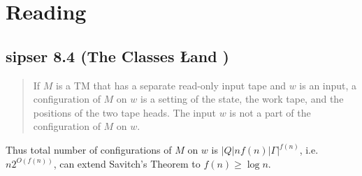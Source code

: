 \documentclass{article}
\begin{document}
\section{Reading}

\subsection{sipser 8.4 (The Classes \L and \NL)}

\begin{quote}
  If \(M\) is a TM that has a separate read-only input tape and \(w\) is an input, a configuration of \(M\) on \(w\) is a setting of the state, the work tape, and the positions of the two tape heads. The input \(w\) is not a part of the configuration of \(M\) on \(w\).
\end{quote}

Thus total number of configurations of \(M\) on \(w\) is \(|Q| n f(n) |\Gamma|^{f(n)}\), i.e. \(n2^{O(f(n))}\), can extend Savitch's Theorem to \(f(n) \geq \log n\).
\end{document}
